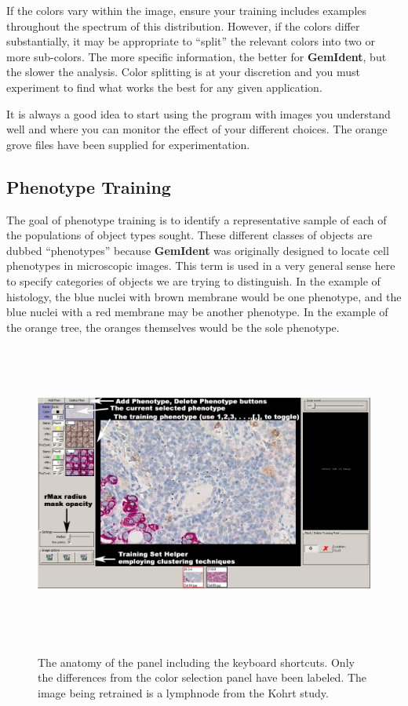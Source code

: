 \documentclass[12pt]{article}
\begin{document}
If the colors vary within the image, ensure your training includes examples throughout the spectrum of this distribution. However, if the colors differ substantially, it may be appropriate to ``split'' the relevant colors into two or more sub-colors. The more specific information, the better for {\bf GemIdent}, but the slower the analysis. Color splitting is at your discretion and you must experiment to find what works the best for any given application.

It is always a good idea to start using the program with images you understand well and where you can monitor the effect of your different choices. The orange grove files have been supplied for experimentation.

\subsection{Phenotype Training}

The goal of phenotype training is to identify a representative sample of each of the populations of object types sought. These different classes of objects are dubbed ``phenotypes'' because {\bf GemIdent} was originally designed to locate cell phenotypes in microscopic images. This term is used in a very general sense here to specify categories of objects we are trying to distinguish.  In the example of histology, the blue nuclei with brown membrane would be one phenotype, and the blue nuclei with a red membrane may be another phenotype. In the example of the orange tree, the oranges themselves would be the sole phenotype.

\begin{figure}[htp]
\centering
\includegraphics[width=476pt,height=281pt]{phenotypetraining.jpg}
\label{fig:phenotypetraining}
\caption{\sf The anatomy of the panel including the keyboard shortcuts. Only the differences from the {\sf color selection} panel have been labeled. The image being retrained is a lymphnode from the Kohrt study\cite{kohrt}.}
\end{figure}
\end{document}
